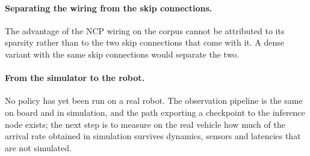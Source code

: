 \paragraph{Separating the wiring from the skip connections.}
The advantage of the NCP wiring on the corpus cannot be attributed to its
sparsity rather than to the two skip connections that come with it. A dense
variant with the same skip connections would separate the two.

\paragraph{From the simulator to the robot.}
No policy has yet been run on a real robot. The observation pipeline is the same
on board and in simulation, and the path exporting a checkpoint to the
inference node exists; the next step is to measure on the real vehicle how much
of the arrival rate obtained in simulation survives dynamics, sensors and
latencies that are not simulated.

